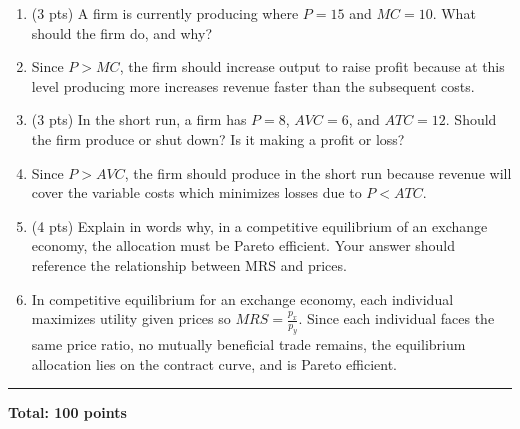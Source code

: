 \documentclass[11pt]{article}
\begin{document}
\begin{enumerate}[label=(\alph*)]
    \item (3 pts) A firm is currently producing where $P = 15$ and $MC = 10$. What should the firm do, and why?
    \item[] Since $P>MC$, the firm should increase output to raise profit because at this level producing more increases revenue faster than the subsequent costs.
    
    \item (3 pts) In the short run, a firm has $P = 8$, $AVC = 6$, and $ATC = 12$. Should the firm produce or shut down? Is it making a profit or loss?
    \item[] Since $P>AVC$, the firm should produce in the short run because revenue will cover the variable costs which minimizes losses due to $P<ATC$.
    
    \item (4 pts) Explain in words why, in a competitive equilibrium of an exchange economy, the allocation must be Pareto efficient. Your answer should reference the relationship between MRS and prices.
    \item[] In competitive equilibrium for an exchange economy, each individual maximizes utility given prices so $MRS=\frac{p_x}{p_y}$. Since each individual faces the same price ratio, no mutually beneficial trade remains, the equilibrium allocation lies on the contract curve, and is Pareto efficient. 
\end{enumerate}

\vspace{0em}
\noindent\rule{\textwidth}{0.4pt}

\vspace{1em}
\noindent\textbf{Total: 100 points}
\end{document}

